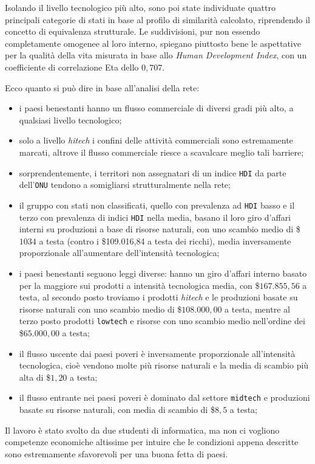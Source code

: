 \documentclass[]{article}
\begin{document}
\begin{multicols}{2}
	Isolando il livello tecnologico più alto, sono poi state individuate quattro principali categorie di stati in base al profilo di similarità calcolato, riprendendo il concetto di equivalenza strutturale. Le suddivisioni, pur non essendo completamente omogenee al loro interno, spiegano piuttosto bene le aspettative per la qualità della vita misurata in base allo \textit{Human Development Index}, con un coefficiente di correlazione Eta dello $0,707$.
	
	Ecco quanto si può dire in base all'analisi della rete:
	\begin{itemize}
		\item i paesi benestanti hanno un flusso commerciale di diversi gradi più alto, a qualsiasi livello tecnologico;
		\item solo a livello \textit{hitech} i confini delle attività commerciali sono estremamente marcati, altrove il flusso commerciale riesce a scavalcare meglio tali barriere;
		\item sorprendentemente, i territori non assegnatari di un indice \texttt{HDI} da parte dell'\texttt{ONU} tendono a somigliarsi strutturalmente nella rete;
		\item il gruppo con stati non classificati, quello con prevalenza ad \texttt{HDI} basso e il terzo con prevalenza di indici \texttt{HDI} nella media, basano il loro giro d'affari interni su produzioni a base di risorse naturali, con uno scambio medio di \$$1034$ a testa (contro i \$109.016,84 a testa dei ricchi), media inversamente proporzionale all'aumentare dell'intensità tecnologica;
		\item i paesi benestanti seguono leggi diverse: hanno un giro d'affari interno basato per la maggiore sui prodotti a intensità tecnologica media, con \$$167.855,56$ a testa, al secondo posto troviamo i prodotti \textit{hitech} e le produzioni basate su risorse naturali con uno scambio medio di \$$108.000,00$ a testa, mentre al terzo posto prodotti \texttt{lowtech} e risorse con uno scambio medio nell'ordine dei \$$65.000,00$ a testa;
		\item il flusso uscente dai paesi poveri è inversamente proporzionale all'intensità tecnologica, cioè vendono molte più risorse naturali e la media di scambio più alta di \$$1,20$ a testa;
		\item il flusso entrante nei paesi poveri è dominato dal settore \texttt{midtech} e produzioni basate su risorse naturali, con media di scambio di \$$8,5$ a testa;
	\end{itemize}
	Il lavoro è stato svolto da due studenti di informatica, ma non ci vogliono competenze economiche altissime per intuire che le condizioni appena descritte sono estremamente sfavorevoli per una buona fetta di paesi.
	

\end{multicols}
\end{document}
